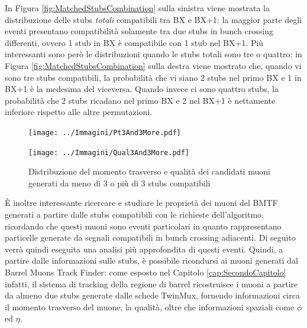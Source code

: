 In Figura \ref{fig:MatchedStubsCombination} sulla sinistra viene mostrata la distribuzione delle stubs \textit{totali} compatibili tra BX e BX+1: la maggior parte degli eventi presentano compatibilità solamente tra due stubs in bunch crossing differenti, ovvero 1 stub in BX è compatibile con 1 stub nel BX+1. Più interessanti sono però le distribuzioni quando le stubs totali sono tre o quattro: in Figura \ref{fig:MatchedStubsCombination} sulla destra viene mostrato che, quando vi sono tre stubs compatibili, la probabilità che vi siano 2 stubs nel primo BX e 1 in BX+1 è la medesima del viceversa. Quando invece ci sono quattro stubs, la probabilità che 2 stubs ricadano nel primo BX e 2 nel BX+1 è nettamente inferiore rispetto alle altre permutazioni. 



\begin{figure}[t]
  \centering
  \begin{minipage}[b]{0.48\textwidth}
    \centering
    \texttt{[image: ../Immagini/Pt3And3More.pdf]} 
    \end{minipage}
    \hfill 
    \begin{minipage}[b]{0.48\textwidth}
      \centering
      \texttt{[image: ../Immagini/Qual3And3More.pdf]} 
    \end{minipage}
    \caption{Distribuzione del momento trasverso e qualità dei candidati muoni generati da meno di 3 o più di 3 stubs compatibili}
  \label{fig:PtQual3And3More}
\end{figure}



È inoltre interessante ricercare e studiare le proprietà dei muoni del BMTF generati a partire dalle stubs compatibili con le richieste dell'algoritmo, ricordando che questi muoni sono eventi particolari in quanto rappresentano particelle generate da segnali compatibili in bunch crossing adiacenti. 
Di seguito verrà quindi eseguita una analisi più approfondita di questi eventi.\newline
Quindi, a partire dalle informazioni sulle stubs, è possibile ricondursi ai muoni generati dal Barrel Muons Track Finder: come esposto nel Capitolo \ref{cap:SecondoCapitolo} infatti, il sistema di tracking della regione di barrel ricostruisce i muoni a partire da almeno due stubs generate dalle schede TwinMux, fornendo informazioni circa il momento trasverso del muone, la qualità, oltre che informazioni spaziali come $\phi$ ed $\eta$. 

